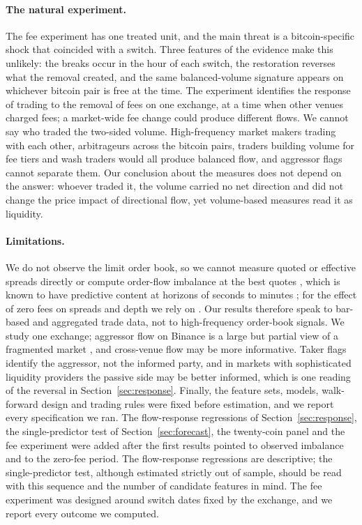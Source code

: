 \documentclass[11pt]{article}
\begin{document}
\paragraph{The natural experiment.} The fee experiment has one treated unit, and the main threat is
a bitcoin-specific shock that coincided with a switch. Three features of the evidence make this
unlikely: the breaks occur in the hour of each switch, the restoration reverses what the removal
created, and the same balanced-volume signature appears on whichever bitcoin pair is free at the
time. The experiment identifies the response of trading to the removal of fees on one exchange, at a
time when other venues charged fees; a market-wide fee change could produce different flows. We
cannot say who traded the two-sided volume. High-frequency market makers trading with each other,
arbitrageurs across the bitcoin pairs, traders building volume for fee tiers and wash traders would
all produce balanced flow, and aggressor flags cannot separate them. Our conclusion about the
measures does not depend on the answer: whoever traded it, the volume carried no net direction and
did not change the price impact of directional flow, yet volume-based measures read it as liquidity.

\paragraph{Limitations.} We do not observe the limit order book, so we cannot measure quoted or
effective spreads directly or compute order-flow imbalance at the best quotes \citep{cont2014}, which
is known to have predictive content at horizons of seconds to minutes \citep{kolm2023}; for the effect
of zero fees on spreads and depth we rely on \citet{galati2024}. Our results therefore speak to
bar-based and aggregated trade data, not to high-frequency order-book signals. We study one exchange;
aggressor flow on Binance is a large but partial view of a fragmented market \citep{makarov2020}, and
cross-venue flow may be more informative. Taker flags identify the aggressor, not the informed party,
and in markets with sophisticated liquidity providers the passive side may be better informed, which
is one reading of the reversal in Section~\ref{sec:response}. Finally, the feature sets, models,
walk-forward design and trading rules were fixed before estimation, and we report every specification
we ran. The flow-response regressions of Section~\ref{sec:response}, the single-predictor test of
Section~\ref{sec:forecast}, the twenty-coin panel and the fee experiment were added after the first
results pointed to observed imbalance and to the zero-fee period. The flow-response regressions are
descriptive; the single-predictor test, although estimated strictly out of sample, should be read
with this sequence and the number of candidate features in mind. The fee experiment was designed
around switch dates fixed by the exchange, and we report every outcome we computed.
\end{document}
